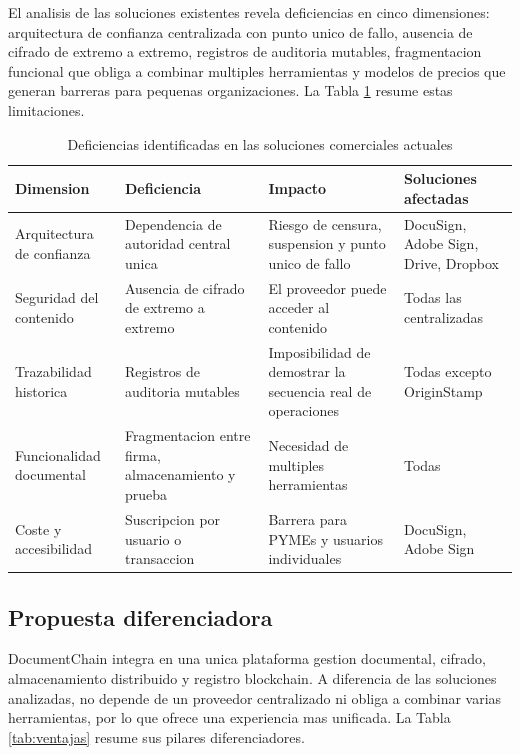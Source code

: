 \documentclass[11pt, a4paper]{article}
\begin{document}
El analisis de las soluciones existentes revela deficiencias en cinco dimensiones: arquitectura de confianza centralizada con punto unico de fallo, ausencia de cifrado de extremo a extremo, registros de auditoria mutables, fragmentacion funcional que obliga a combinar multiples herramientas y modelos de precios que generan barreras para pequenas organizaciones. La Tabla \ref{tab:deficiencias} resume estas limitaciones.

\begin{table}[H]
\centering
\renewcommand{\arraystretch}{1.4}
\small
\begin{tabular}{|p{2.5cm}|p{3cm}|p{3cm}|p{3.5cm}|}
\hline
\textbf{Dimension} & \textbf{Deficiencia} & \textbf{Impacto} & \textbf{Soluciones afectadas} \\
\hline
Arquitectura de confianza & Dependencia de autoridad central unica & Riesgo de censura, suspension y punto unico de fallo & DocuSign, Adobe Sign, Drive, Dropbox \\
\hline
Seguridad del contenido & Ausencia de cifrado de extremo a extremo & El proveedor puede acceder al contenido & Todas las centralizadas \\
\hline
Trazabilidad historica & Registros de auditoria mutables & Imposibilidad de demostrar la secuencia real de operaciones & Todas excepto OriginStamp \\
\hline
Funcionalidad documental & Fragmentacion entre firma, almacenamiento y prueba & Necesidad de multiples herramientas & Todas \\
\hline
Coste y accesibilidad & Suscripcion por usuario o transaccion & Barrera para PYMEs y usuarios individuales & DocuSign, Adobe Sign \\
\hline
\end{tabular}
\caption{Deficiencias identificadas en las soluciones comerciales actuales}
\label{tab:deficiencias}
\end{table}

\subsection{Propuesta diferenciadora}

DocumentChain integra en una unica plataforma gestion documental, cifrado, almacenamiento distribuido y registro blockchain. A diferencia de las soluciones analizadas, no depende de un proveedor centralizado ni obliga a combinar varias herramientas, por lo que ofrece una experiencia mas unificada. La Tabla \ref{tab:ventajas} resume sus pilares diferenciadores.
\end{document}
